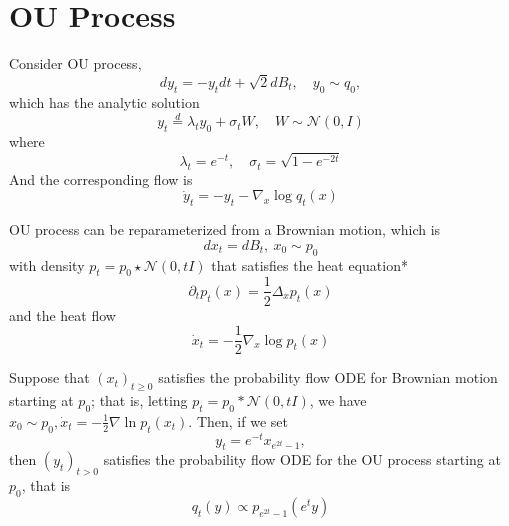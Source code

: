 \documentclass[a4paper,12pt]{article}
\begin{document}
\section{OU Process}
Consider OU process,
\begin{equation*}
  dy_t=-y_t dt+\sqrt{2} dB_t, \quad y_0 \sim q_0,
\end{equation*}
which has the analytic solution
\begin{equation*}
  y_t \stackrel{d}{=} \lambda_t y_0+\sigma_t W, \quad W \sim \mathcal{N}\left(0, I\right)
\end{equation*}
where
\begin{equation*}
  \lambda_t=e^{-t}, \quad \sigma_t=\sqrt{1-e^{-2 t}}
\end{equation*}
And the corresponding flow is
\begin{equation*}
  \dot{y}_t = -y_t - \nabla_x\log q_t(x)
\end{equation*}

OU process can be reparameterized from a Brownian motion, which is
\begin{equation*}
  dx_t = dB_t,~x_0 \sim p_0
\end{equation*}
with density $p_t = p_0 \star \mathcal{N}\left(0, tI\right)$ that satisfies the heat equation*
\begin{equation*}
  \partial_t p_t(x) =\frac{1}{2}\Delta_x p_t(x)
\end{equation*}
and the heat flow
\begin{equation*}
  \dot{x}_t = -\frac{1}{2}\nabla_x\log p_t(x)
\end{equation*}
\begin{prop}
  Suppose that $\left(x_t\right)_{t \geq 0}$ satisfies the probability flow ODE for Brownian motion starting at $p_0$; that is, letting $p_t=p_0 * \mathcal{N}(0, t I)$, we have $x_0 \sim p_0, \dot{x}_t=-\frac{1}{2} \nabla \ln p_t\left(x_t\right)$. Then, if we set
  \begin{equation*}
    y_t=e^{-t} x_{e^{2 t}-1},
  \end{equation*}
  then $\left(y_t\right)_{t>0}$ satisfies the probability flow ODE for the OU process starting at $p_0$, that is
  \begin{equation*}
    q_t(y) \propto p_{e^{2 t}-1}\left(e^t y\right)
  \end{equation*}
\end{prop}
























  \printbibliography
\end{document}
